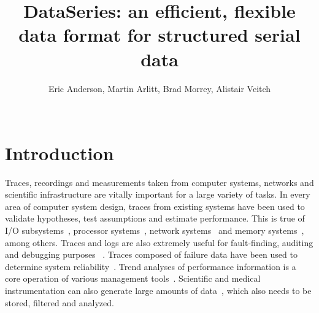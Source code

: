 \documentclass{acm_proc_article-sp}
\begin{document}
\newcommand{\DataSeries}{DataSeries}
\newcommand{\DS}{DS}

\title{DataSeries: an efficient, flexible data format for structured serial data}
\author{
\alignauthor
Eric Anderson, Martin Arlitt, Brad Morrey, Alistair Veitch  \\
  \\
}

\maketitle
 

\section{Introduction}\label{sec:intro}

Traces, recordings and measurements taken from computer systems,
networks and scientific infrastructure are vitally important for a
large variety of tasks. In every area of computer system design,
traces from existing systems have been used to validate hypotheses,
test assumptions and estimate performance. This is true of I/O
subsystems~\cite{IORef,Ji03,Uysal03}, processor
systems~\cite{ProcRef}, network systems~\cite{NetRef} and memory
systems~\cite{MemRef}, among others. Traces and logs are also
extremely useful for fault-finding, auditing and debugging purposes
~\cite{DebugRef}. Traces composed of failure data have been used to
determine system reliability~\cite{ReliabilityRef, Schroeder07,
Pinheiro07}. Trend analyses of performance information is a core
operation of various management tools~\cite{MgmtRef}. Scientific and
medical instrumentation can also generate large amounts of
data~\cite{SciRef}, which also needs to be stored, filtered and
analyzed.
\end{document}
